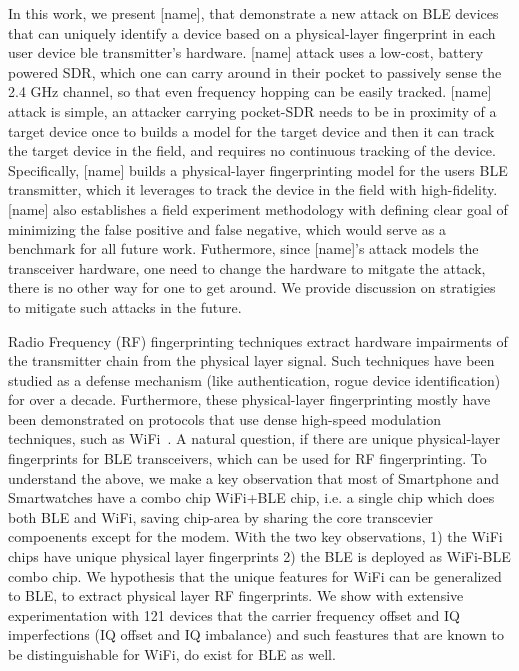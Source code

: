 
In this work, we present [name], that demonstrate a new attack on BLE devices that can uniquely
identify a device based on a physical-layer fingerprint in each user device 
ble transmitter's hardware. 
%
[name] attack uses a low-cost, battery powered SDR, which one can carry around in their pocket to 
passively sense the  2.4 GHz channel, so that even frequency hopping can 
be easily tracked. 
[name] attack is simple, an attacker carrying pocket-SDR needs to be in proximity of a target device once 
to builds a model for the target device and then it can track the target device in the field, and 
requires no continuous tracking of the device. 
%
Specifically, [name] builds a physical-layer fingerprinting model for the users BLE 
transmitter, which it leverages to track the device in the field with high-fidelity.
%
[name] also establishes a field experiment methodology with defining clear goal of minimizing the
 false positive and false negative, which would serve as a benchmark for all future work. 
%
Futhermore, since [name]'s attack models the transceiver hardware, one need to change the hardware to mitgate the 
attack, there is no other way for one to get around. 
We provide discussion on stratigies to mitigate such attacks in the future.

%
Radio Frequency (RF) fingerprinting techniques extract hardware 
impairments of the transmitter chain from the physical layer signal. 
Such techniques have been studied as a defense mechanism (like authentication, 
rogue device identification) for over a decade. Furthermore, these physical-layer
fingerprinting mostly have been demonstrated on protocols that use dense high-speed 
modulation techniques, such as WiFi~\cite{}.
%
A natural question, if there are unique physical-layer fingerprints for BLE transceivers,
 which can be used for RF fingerprinting. 
%
To understand the above, we make a key observation that most of Smartphone 
and Smartwatches have a combo chip WiFi+BLE chip, i.e. a single chip which
does both BLE and WiFi, saving chip-area by sharing the core transcevier 
compoenents except for the modem. 
%
With the two key observations, 1) the WiFi chips have unique physical layer
 fingerprints 2) the BLE is deployed as WiFi-BLE combo chip. We hypothesis that 
 the unique features for WiFi can be generalized to BLE, to extract physical layer 
 RF fingerprints. We show with extensive experimentation with 121 devices that the carrier frequency 
 offset and IQ imperfections (IQ offset and IQ imbalance) and such feastures that are 
 known to be distinguishable for WiFi, do exist for BLE as well. 

